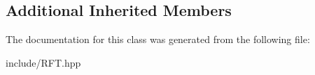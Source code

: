 \subsection*{Additional Inherited Members}


The documentation for this class was generated from the following file\+:\begin{DoxyCompactItemize}
\item 
include/R\+F\+T.\+hpp\end{DoxyCompactItemize}
